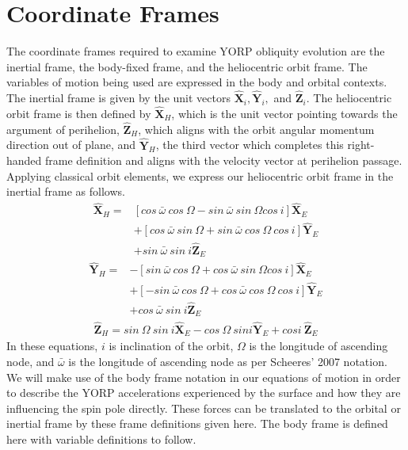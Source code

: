 \section{Coordinate Frames}\label{coord}

The coordinate frames required to examine YORP obliquity evolution are the inertial frame, the body-fixed frame, and the heliocentric orbit frame. The variables of motion being used are expressed in the body and orbital contexts. The inertial frame is given by the unit vectors $\mathbf{\hat{X}}_i, \mathbf{\hat{Y}}_i,$ and $\mathbf{\hat{Z}}_i$. The heliocentric orbit frame is then defined by $\mathbf{\hat{X}}_H$, which is the unit vector pointing towards the argument of perihelion, $\mathbf{\hat{Z}}_H$, which aligns with the orbit angular momentum direction out of plane, and $\mathbf{\hat{Y}}_H$, the third vector which completes this right-handed frame definition and aligns with the velocity vector at perihelion passage.
Applying classical orbit elements, we express our heliocentric orbit frame in the inertial frame as follows.
\begin{equation}
\begin{split}
\mathbf{\hat{X}}_H = &[cos \: \bar{\omega} \:cos\:\Omega - sin \:\bar{\omega}\:sin\:\Omega cos \:i] \mathbf{\hat{X}}_E \\
& + [cos\:\bar{\omega}\:sin\:\Omega + sin\:\bar{\omega}\:cos\:\Omega \:cos\: i] \mathbf{\hat{Y}}_E \\
& + sin\: \bar{\omega} \:sin \:i \mathbf{\hat{Z}}_E
\end{split}
\end{equation}
\begin{equation}
\begin{split}
\mathbf{\hat{Y}}_H = &-[sin \: \bar{\omega} \:cos\:\Omega + cos \:\bar{\omega}\:sin\:\Omega cos \:i] \mathbf{\hat{X}}_E \\
& + [-sin\:\bar{\omega}\:cos\:\Omega + cos\:\bar{\omega}\:cos\:\Omega \:cos\: i] \mathbf{\hat{Y}}_E \\
& + cos\: \bar{\omega} \:sin \:i \mathbf{\hat{Z}}_E
\end{split}
\end{equation}
\begin{equation}
\begin{split}
\mathbf{\hat{Z}}_H = sin \: \Omega \: sin\: i \mathbf{\hat{X}}_E - cos \: \Omega\: sin i \mathbf{\hat{Y}}_E + cos i \:\mathbf{\hat{Z}}_E
\end{split}
\end{equation}
In these equations, $i$ is inclination of the orbit, $\Omega$ is the longitude of ascending node, and $\bar{\omega}$ is the longitude of ascending node as per Scheeres' 2007 notation. We will make use of the body frame notation in our equations of motion in order to describe the YORP accelerations experienced by the surface and how they are influencing the spin pole directly. These forces can be translated to the orbital or inertial frame by these frame definitions given here. The body frame is defined here with variable definitions to follow.

